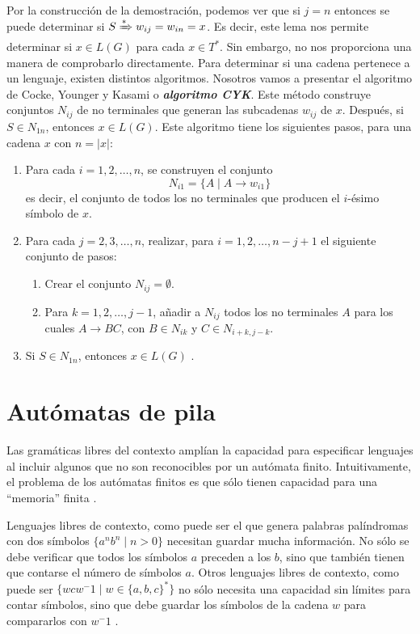 Por la construcción de la demostración, podemos ver que si $j=n$ entonces se puede determinar si $S\xRightarrow{*}w_{ij}=w_{in}=x$. Es decir, este lema nos permite determinar si $x\in L(G)$ para cada $x\in T^*$. Sin embargo, no nos
proporciona una manera de comprobarlo directamente. Para determinar si una cadena pertenece a un lenguaje, existen
distintos algoritmos. Nosotros vamos a presentar el algoritmo de Cocke, Younger y Kasami o 
\textbf{\textit{algoritmo CYK}}. Este método construye conjuntos $N_{ij}$ de no terminales que generan las subcadenas 
$w_{ij}$ de $x$. Después, si $S\in N_{1n}$, entonces $x\in L(G)$. Este algoritmo tiene los siguientes pasos, para una 
cadena $x$ con $n=|x|$:
\begin{enumerate}
    \item Para cada $i=1,2,\dots,n$, se construyen el conjunto
    \begin{equation}
        N_{i1}=\{A\mid A\to w_{i1}\}
    \end{equation}
    es decir, el conjunto de todos los no terminales que producen el $i$-ésimo símbolo de $x$.
    \item Para cada $j=2,3,\dots,n$, realizar, para $i=1,2,\dots,n-j+1$ el siguiente conjunto de pasos:
        \begin{enumerate}
            \item Crear el conjunto $N_{ij}=\emptyset$.
            \item Para $k=1,2,\dots,j-1$, añadir a $N_{ij}$ todos los no terminales $A$ para los cuales $A\to BC$, con
            $B\in N_{ik}$ y $C\in N_{i+k,j-k}$.
        \end{enumerate}
    \item Si $S\in N_{1n}$, entonces $x\in L(G)$ \cite{kelley_2001}.
\end{enumerate}

\section{Autómatas de pila}

Las gramáticas libres del contexto amplían la capacidad para especificar lenguajes al incluir algunos que no son 
reconocibles por un autómata finito. Intuitivamente, el problema de los autómatas finitos es que sólo tienen capacidad 
para una ``memoria'' finita \cite{kelley_2001}. 

\vspace{10pt}
Lenguajes libres de contexto, como puede ser el que genera palabras palíndromas con dos símbolos $\{a^nb^n\mid n>0\}$ 
necesitan guardar mucha información. No sólo se debe verificar que todos los símbolos $a$ preceden a los $b$, sino que 
también tienen que contarse el número de símbolos $a$. Otros lenguajes libres de contexto, como puede ser 
$\{wcw^-1\mid w\in\{a,b,c\}^*\}$ no sólo necesita una capacidad sin límites para contar símbolos, sino que debe guardar
los símbolos de la cadena $w$ para compararlos con $w^-1$ \cite{kelley_2001}.

